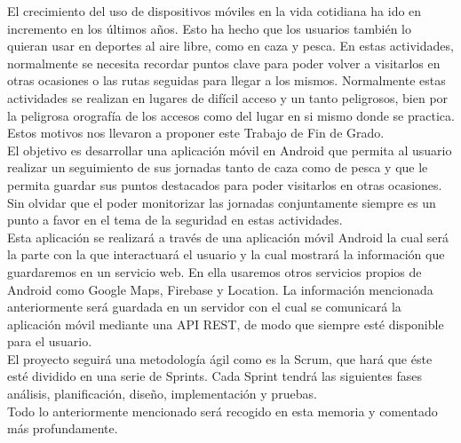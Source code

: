 El crecimiento del uso de dispositivos móviles en la vida cotidiana ha ido en incremento en los últimos años. Esto ha hecho que los usuarios también lo quieran usar en deportes al aire libre, como en caza y pesca. En estas actividades, normalmente se necesita recordar puntos clave para poder volver a visitarlos en otras ocasiones o las rutas seguidas para llegar a los mismos. Normalmente estas actividades se realizan en lugares de difícil acceso y un tanto peligrosos, bien por la peligrosa orografía de los accesos como del lugar en si mismo donde se practica.\\

Estos motivos nos llevaron a proponer este Trabajo de Fin de Grado.\\


El objetivo es desarrollar una aplicación móvil en Android que permita al usuario realizar un seguimiento de sus jornadas tanto de caza como de pesca  y que le permita guardar sus puntos destacados para poder visitarlos en otras ocasiones. Sin olvidar que el poder monitorizar las jornadas conjuntamente siempre es un punto a favor en el tema de la seguridad en estas actividades.\\



Esta aplicación se realizará a través de una aplicación móvil Android la cual será la parte con la que interactuará el usuario y la cual mostrará la información que guardaremos en un servicio web. En ella usaremos otros servicios propios de Android como Google Maps, Firebase y Location. La información mencionada anteriormente será guardada en un servidor con el cual se comunicará la aplicación móvil mediante una API REST, de modo que siempre esté disponible para el usuario.\\



El proyecto seguirá una metodología ágil como es la Scrum, que hará que éste esté dividido en una serie de Sprints. Cada Sprint tendrá las siguientes fases análisis, planificación, diseño, implementación y pruebas.\\

Todo lo anteriormente mencionado será recogido en esta memoria y comentado más profundamente.






